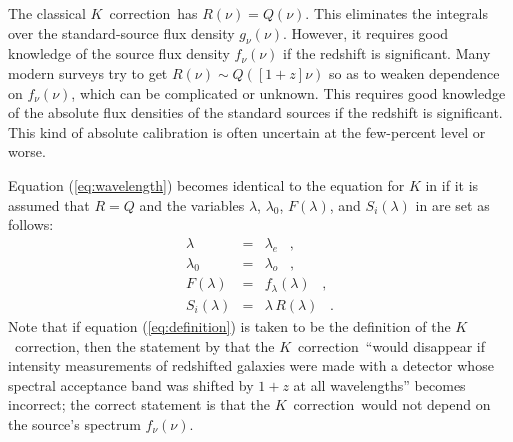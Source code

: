 \documentclass[preprint]{aastex}
\newcommand{\kcorrection}{$K$~correction}
\newcommand{\lambdaobs}{\lambda_o}
\newcommand{\lambdaemit}{\lambda_e}
\begin{document}
The classical \kcorrection\ has $R(\nu)=Q(\nu)$.  This eliminates the
integrals over the standard-source flux density $g_{\nu}(\nu)$.
However, it requires good knowledge of the source flux density
$f_{\nu}(\nu)$ if the redshift is significant.  Many modern surveys
try to get $R(\nu)\sim Q([1+z]\nu)$ so as to weaken dependence on
$f_{\nu}(\nu)$, which can be complicated or unknown.  This requires
good knowledge of the absolute flux densities of the standard sources
if the redshift is significant.  This kind of absolute calibration is
often uncertain at the few-percent level or worse.

Equation (\ref{eq:wavelength}) becomes identical to the equation for
$K$ in \citet{oke68a} if it is assumed that $R=Q$ and the variables
$\lambda$, $\lambda_0$, $F(\lambda)$, and $S_i(\lambda)$ in
\citet{oke68a} are set as follows:
\begin{eqnarray}\displaystyle
\lambda & = & \lambdaemit \;\;\;, \nonumber \\
\lambda_0 & = & \lambdaobs \;\;\;, \nonumber \\
F(\lambda) & = & f_{\lambda}(\lambda) \;\;\;, \nonumber \\
S_i(\lambda) & = & \lambda\,R(\lambda) \;\;\;.
\end{eqnarray}
Note that if equation (\ref{eq:definition}) is taken to be the
definition of the \kcorrection, then the statement by \citet{oke68a}
that the \kcorrection\ ``would disappear if intensity measurements of
redshifted galaxies were made with a detector whose spectral
acceptance band was shifted by $1+z$ at all wavelengths'' becomes
incorrect; the correct statement is that the \kcorrection\ would not
depend on the source's spectrum $f_{\nu}(\nu)$.



\end{document}
